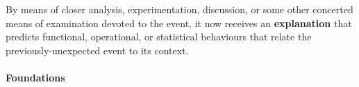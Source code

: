 \begin{defn}\label{def:explanation}
\hypertarget{def:explanation}{}By means of closer analysis,
experimentation, discussion, or some other concerted means of
examination devoted to the event, it now receives an
\textbf{explanation} that predicts functional, operational, or
statistical behaviours that relate the previously-unexpected event to
its context.
\end{defn}
\paragraph{\textbf{\upshape Foundations}}
                                         

